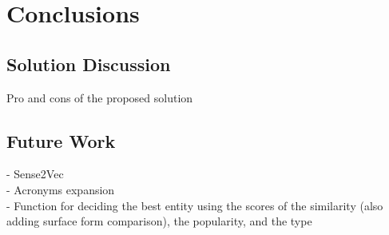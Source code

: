\chapter{Conclusions}

\section{Solution Discussion}
Pro and cons of the proposed solution
\section{Future Work}
- Sense2Vec \\
- Acronyms expansion \\
- Function for deciding the best entity using the scores of the similarity (also adding surface form comparison), the popularity, and the type  